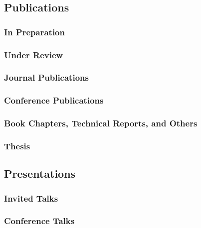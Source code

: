 \documentclass[letterpaper, 11pt]{article}
\begin{document}
\subsection*{Publications}
\subsubsection*{In Preparation}
\renewcommand*{\labelenumi}{[P\theenumi]}
\subsubsection*{Under Review}
\renewcommand*{\labelenumi}{[U\theenumi]}
\subsubsection*{Journal Publications}
\renewcommand*{\labelenumi}{[J\theenumi]}
\subsubsection*{Conference Publications}
\renewcommand*{\labelenumi}{[C\theenumi]}
\subsubsection*{Book Chapters, Technical Reports, and Others}
\renewcommand*{\labelenumi}{[B\theenumi]}
\subsubsection*{Thesis}
\renewcommand*{\labelenumi}{[T\theenumi]}

\subsection*{Presentations}
\subsubsection*{Invited Talks}
\renewcommand*{\labelenumi}{[I\theenumi]}
\subsubsection*{Conference Talks}
\renewcommand*{\labelenumi}{[M\theenumi]}
\end{document}
